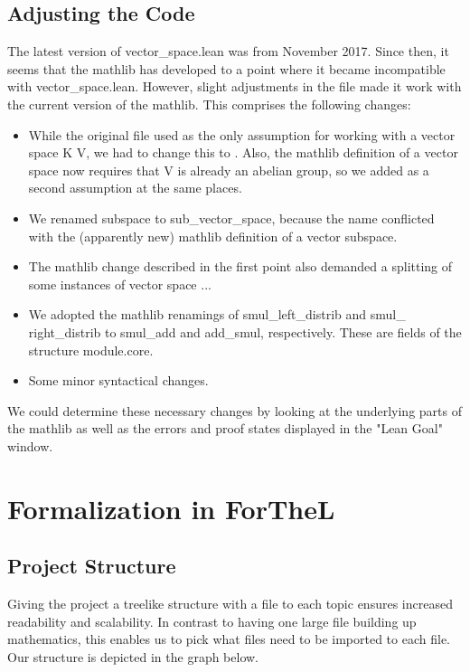 \documentclass[11pt]{article}
\begin{document}
\subsection{Adjusting the Code}
The latest version of vector\_space.lean was from November 2017. Since then, it seems that the mathlib has developed to a point where it became incompatible with vector\_space.lean.
However, slight adjustments in the file made it work with the current version of the mathlib. This comprises the following changes:
\begin{itemize}
\item While the original file used {\ftl [field K]} as the only assumption for working with a {\ftl vector space K V}, we had to change this to {}. Also, the mathlib definition of a vector space now requires that V is already an abelian group, so we added {} as a second assumption at the same places.
\item We renamed {\lean subspace} to {\lean sub\_vector\_space}, because the name conflicted with the (apparently new) mathlib definition of a vector subspace.
\item The mathlib change described in the first point also demanded a splitting of some instances of vector space ...
\item We adopted the mathlib renamings of {\lean smul\_left\_distrib} and {\lean smul\_ right\_distrib} to {\lean smul\_add} and {\lean add\_smul}, respectively. These are fields of the structure {\lean module.core}.
\item Some minor syntactical changes.
\end{itemize}
We could determine these necessary changes by looking at the underlying parts of the mathlib as well as the errors and proof states displayed in the "Lean Goal" window.



\newpage
\lstset{style=ftl}
\section{Formalization in ForTheL}
\subsection{Project Structure}
Giving the project a treelike structure with a file to each topic ensures increased readability and scalability. 
In contrast to having one large file building up mathematics, this enables us to pick what files need to be imported to each file. 
Our structure is depicted in the graph below.
\end{document}
